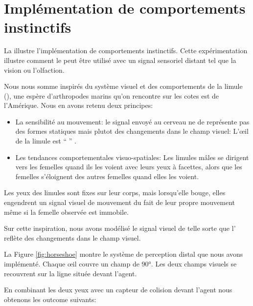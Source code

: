 \section{Implémentation de comportements instinctifs}
\label{sec:horseshoe}

\noindent
La  illustre l'implémentation de comportements instinctifs.
Cette expérimentation illustre comment le  peut être utilisé avec un signal sensoriel distant tel que la vision ou l'olfaction. 

Nous nous somme inspirés du système visuel et des comportements de la limule (), une espère d'arthropodes marins qu'on rencontre sur les cotes est de l'Amérique. 
Nous en avons retenu deux principes:
\begin{itemize}[label=\scalebox{.85}{$\diamond$}]
	\item La sensibilité au mouvement: le signal envoyé au cerveau ne de représente pas des formes statiques mais plutot des changements dans le champ visuel: L'\oe il de la limule est `` '' \cite[p.~172]{barlow_limulus_2001}. 
	\item Les tendances comportementales visuo-spatiales: Les limules mâles se dirigent vers les femelles quand ils les voient avec leurs yeux à facettes, alors que les femelles s'éloignent des autres femelles quand elles les voient. 
\end{itemize}

Les yeux des limules sont fixes sur leur corps, mais lorsqu'elle bouge, elles engendrent un signal visuel de mouvement du fait de leur propre mouvement même si la femelle observée est immobile.

Sur cette inspiration, nous avons modélisé le signal visuel de telle sorte que l' reflète des changements dans le champ visuel. 

La Figure \ref{fig:horseshoe} montre le système de perception distal que nous avons implémenté.  
Chaque \oe il couvre un champ de 90°. 
Les deux champs visuels se recouvrent sur la ligne située devant l'agent. 

En combinant les deux yeux avec un capteur de colision devant l'agent nous obtenons les outcome suivants: 

